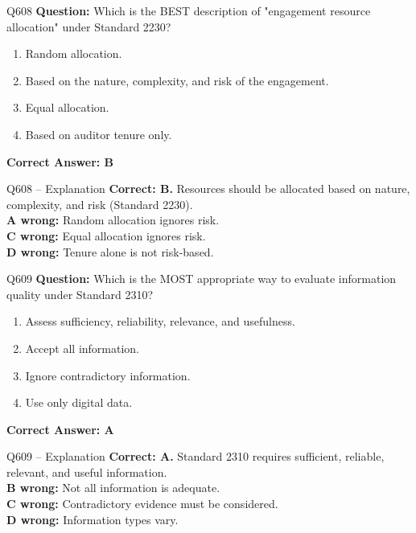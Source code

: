 \documentclass[aspectratio=169,10pt]{beamer}
\begin{document}
	\begin{frame}[t]{Q608}
		\small
		\textbf{Question:} Which is the BEST description of "engagement resource allocation" under Standard 2230?
		\begin{enumerate}[label=\Alph*.,itemsep=1pt,topsep=2pt]
			\item Random allocation.
			\item Based on the nature, complexity, and risk of the engagement.
			\item Equal allocation.
			\item Based on auditor tenure only.
		\end{enumerate}
		\vspace{4pt}
		\textbf{Correct Answer: B}
	\end{frame}
	
	\begin{frame}[t]{Q608 -- Explanation}
		\small
		\textbf{Correct: B.} Resources should be allocated based on nature, complexity, and risk (Standard 2230). \\[4pt]
		\textbf{A wrong:} Random allocation ignores risk. \\[2pt]
		\textbf{C wrong:} Equal allocation ignores risk. \\[2pt]
		\textbf{D wrong:} Tenure alone is not risk-based.
	\end{frame}
	
	\begin{frame}[t]{Q609}
		\small
		\textbf{Question:} Which is the MOST appropriate way to evaluate information quality under Standard 2310?
		\begin{enumerate}[label=\Alph*.,itemsep=1pt,topsep=2pt]
			\item Assess sufficiency, reliability, relevance, and usefulness.
			\item Accept all information.
			\item Ignore contradictory information.
			\item Use only digital data.
		\end{enumerate}
		\vspace{4pt}
		\textbf{Correct Answer: A}
	\end{frame}
	
	\begin{frame}[t]{Q609 -- Explanation}
		\small
		\textbf{Correct: A.} Standard 2310 requires sufficient, reliable, relevant, and useful information. \\[4pt]
		\textbf{B wrong:} Not all information is adequate. \\[2pt]
		\textbf{C wrong:} Contradictory evidence must be considered. \\[2pt]
		\textbf{D wrong:} Information types vary.
	\end{frame}
	
\end{document}
